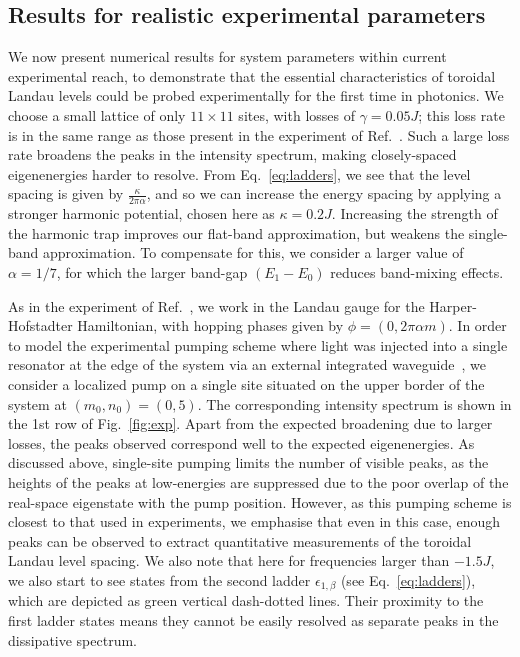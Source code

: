 \documentclass[twocolumn, 10pt, aps, superscriptaddress, floatfix, showpacs, pra, citeautoscript]{revtex4-1}
\begin{document}
\subsection{Results for realistic experimental parameters}
\label{sec:experiment}

We now present numerical results for system parameters within current experimental reach, to demonstrate that the essential characteristics of toroidal Landau levels could be probed experimentally for the first time in photonics. We choose a small
lattice of only $11 \times 11$ sites, with losses of $\gamma = 0.05 J$; this loss rate is in the same range as those present in the experiment of
Ref.~. Such a large loss rate broadens the
peaks in the intensity spectrum, making closely-spaced eigenenergies harder to resolve. From
Eq.~\eqref{eq:ladders}, we see that the level spacing is given by
$\frac{\kappa}{2\pi\alpha}$, and so we can increase the energy spacing by applying a stronger harmonic potential, chosen here as $\kappa = 0.2 J$. Increasing the strength of the harmonic trap improves our flat-band approximation, but weakens the single-band approximation. To compensate for this, we consider a larger value of $\alpha = 1/7$, for which the larger band-gap $(E_1 - E_0)$ reduces band-mixing effects. 

As in the experiment of Ref.~, we work in the Landau gauge for the Harper-Hofstadter Hamiltonian, with hopping phases given by $\phi = (0, 2\pi\alpha m)$. In order to model the experimental pumping scheme where light was injected into a single resonator at the edge of the system via an external integrated waveguide~\cite{hafezi2013imaging}, we consider a localized pump on a single site situated on the upper border of the system at $(m_0,n_0)= (0,5)$. 
The corresponding intensity spectrum is shown in the 1st row of Fig.~\ref{fig:exp}. Apart from the expected
broadening due to larger losses, the peaks observed correspond well to the expected eigenenergies. 
As discussed above, single-site pumping limits the number of visible peaks, as the heights of the peaks at low-energies are suppressed due to the poor overlap of the real-space eigenstate with the pump position. However, as this pumping scheme is closest to that used in experiments, we emphasise that even in this case, enough peaks can be observed to extract quantitative measurements of the toroidal Landau level spacing. We also note that here for frequencies larger
than $-1.5 J$, we also start to see states from the second ladder
$\epsilon_{1,\beta}$ (see Eq.~\eqref{eq:ladders}), which are depicted as green
vertical dash-dotted lines. Their proximity to the first ladder states
means they cannot be easily resolved as separate peaks in the dissipative
spectrum.
\end{document}
